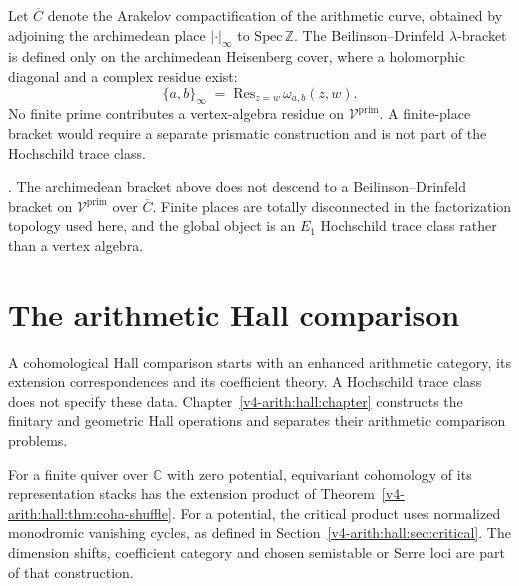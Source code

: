 \begin{definition}
\label{v4-arith:def:arith-lambda-bracket}
Let \(\overline{C}\) denote the Arakelov compactification of the
arithmetic curve, obtained by adjoining the archimedean place
\(|\cdot|_{\infty}\) to \(\mathrm{Spec}\,\mathbb{Z}\).
The Beilinson--Drinfeld \(\lambda\)-bracket is defined only on the
archimedean Heisenberg cover, where a holomorphic diagonal and a
complex residue exist:
\begin{equation}
\{a,b\}_{\infty}\;=\;\mathrm{Res}_{z=w}\,\omega_{a,b}(z,w).
\end{equation}
No finite prime contributes a vertex-algebra residue on
\(\mathcal{V}^{\mathrm{prim}}\). A finite-place bracket would require
a separate prismatic construction and is not part of the Hochschild
trace class.
\end{definition}

\begin{theorem}
\label{v4-arith:thm:chiral-bracket-adelic}
\ClaimStatusProvedHere. The archimedean bracket above does not descend
to a Beilinson--Drinfeld bracket on
\(\mathcal{V}^{\mathrm{prim}}\) over \(\overline{C}\). Finite places are
totally disconnected in the factorization topology used here, and the
global object is an \(E_{1}\) Hochschild trace class rather than a
vertex algebra.
\end{theorem}

\section{The arithmetic Hall comparison}
\label{v4-arith:ks:CoHA-conjectural}

A cohomological Hall comparison starts with an enhanced arithmetic
category, its extension correspondences and its coefficient theory.
A Hochschild trace class does not specify these data.
Chapter~\ref{v4-arith:hall:chapter} constructs the finitary and geometric
Hall operations and separates their arithmetic comparison problems.

\begin{theorem}
\label{v4-arith:thm:KS-CoHA}
For a finite quiver over $\mathbb C$ with zero potential, equivariant
cohomology of its representation stacks has the extension product
of Theorem~\ref{v4-arith:hall:thm:coha-shuffle}.
For a potential, the critical product uses normalized monodromic
vanishing cycles, as defined in
Section~\ref{v4-arith:hall:sec:critical}. The dimension shifts,
coefficient category and chosen semistable or Serre loci are part
of that construction.
\end{theorem}

